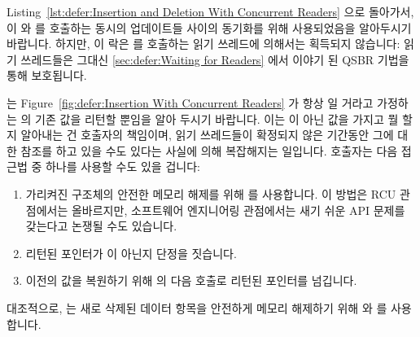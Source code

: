 Listing~\ref{lst:defer:Insertion and Deletion With Concurrent Readers}
으로 돌아가서,  이  와  를
호출하는 동시의 업데이트들 사이의 동기화를 위해 사용되었음을 알아두시기
바랍니다.
하지만, 이 락은  를 호출하는 읽기 쓰레드에 의해서는 획득되지
않습니다:
읽기 쓰레드들은 그대신
\cref{sec:defer:Waiting for Readers} 에서 이야기 된 QSBR 기법을 통해
보호됩니다.

 는
Figure~\ref{fig:defer:Insertion With Concurrent Readers} 가 항상  일
거라고 가정하는  의 기존 값을 리턴할 뿐임을 알아 두시기 바랍니다.
이는  이 아닌 값을 가지고 뭘 할지 알아내는 건 호출자의 책임이며, 읽기
쓰레드들이 확정되지 않은 기간동안 그에 대한 참조를 하고 있을 수도 있다는 사실에
의해 복잡해지는 일입니다.
호출자는 다음 접근법 중 하나를 사용할 수도 있을 겁니다:

\begin{enumerate}
\item	가리켜진 구조체의 안전한 메모리 해제를 위해  를
	사용합니다.
	이 방법은 RCU 관점에서는 올바르지만, 소프트웨어 엔지니어링 관점에서는
	새기 쉬운 API 문제를 갖는다고 논쟁될 수도 있습니다.
\item	리턴된 포인터가  이 아닌지 단정을 짓습니다.
\item	이전의 값을 복원하기 위해  의 다음 호출로 리턴된
	포인터를 넘깁니다.
\end{enumerate}

대조적으로,  는 새로 삭제된 데이터 항목을 안전하게 메모리
해제하기 위해  와  를 사용합니다.

